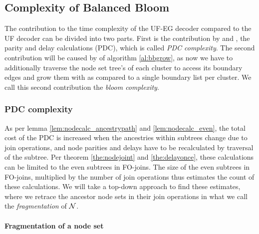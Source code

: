 \subsection{Complexity of Balanced Bloom}\label{sec:ufbbcomplexity}

The contribution to the time complexity of the UF-EG decoder compared to the UF decoder can be divided into two parts. First is the contribution by  and , the parity and delay calculations (PDC), which is called \emph{PDC complexity}. The second contribution will be caused by  of algorithm \ref{al:bbgrow}, as now we have to additionally traverse the node set tree's of each cluster to access its boundary edges and grow them with  as compared to a single boundary list per cluster. We call this second contribution the \emph{bloom complexity}.

\subsubsection{PDC complexity}
As per lemma \ref{lem:nodecalc_ancestrypath} and \ref{lem:nodecalc_even}, the total cost of the PDC is increased when the ancestries within subtrees change due to join operations, and node parities and delays have to be recalculated by traversal of the subtree. Per theorem \ref{the:nodejoint} and \ref{the:delayonce}, these calculations can be limited to the even subtrees in FO-joins. The size of the even subtrees in FO-joins, multiplied by the number of join operations thus estimates the count of these calculations. We will take a top-down approach to find these estimates, where we retrace the ancestor node sets in their join operations in what we call the \emph{fragmentation} of $\mathcal{N}$.

\paragraph{Fragmentation of a node set}


